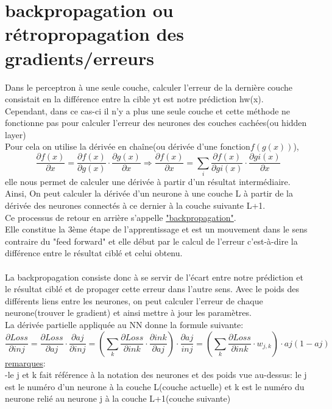 \documentclass[openany,14pt,fleqn]{book} %
\begin{document}
\section{backpropagation ou rétropropagation des gradients/erreurs}
Dans le perceptron à une seule couche, calculer l'erreur de la dernière couche consistait en la différence entre la cible yt est notre prédiction hw(x).\\
Cependant, dans ce cas-ci il n'y a plus une seule couche et cette méthode ne fonctionne pas pour calculer l'erreur des neurones des couches cachées(ou hidden layer)\\
Pour cela on utilise la dérivée en chaîne(ou dérivée d'une fonction$f(g(x)) $),$$\frac{\partial f(x)}{\partial x} = \frac{\partial f(x)}{\partial g(x)}\cdot \frac{\partial g(x)}{\partial x}
\Rightarrow \frac{\partial f(x)}{\partial x} = \sum_{i} \frac{\partial f(x)}{\partial gi(x)}\cdot \frac{\partial gi(x)}{\partial x} $$ elle nous permet de calculer une dérivée à partir d'un résultat intermédiaire. Ainsi, On peut calculer la dérivée d'un neurone à une couche L à partir de la dérivée des neurones connectés à ce dernier à la couche suivante L+1.\cite{Hugo_Larochelle12}\\
Ce processus de retour en arrière s'appelle \underline{"backpropagation"}.\\
Elle constitue la 3ème étape de l'apprentissage et est un mouvement dans le sens contraire du "feed forward" et elle début par le calcul de l'erreur c'est-à-dire la différence entre le résultat ciblé et celui obtenu.\\
\\La backpropagation consiste donc à se servir de l'écart entre notre prédiction et le résultat ciblé et de propager cette erreur dans l'autre sens. Avec le poids des différents liens entre les neurones, on peut calculer l'erreur de chaque neurone(trouver le gradient) et ainsi mettre à jour les paramètres.\\
La dérivée partielle appliquée au NN donne la formule suivante: 
\[\frac{\partial Loss}{\partial inj} = \frac{\partial Loss}{\partial aj}\cdot \frac{\partial aj}{\partial inj} = (\sum_{k} \frac{\partial Loss}{\partial ink}\cdot \frac{\partial ink}{\partial aj})\cdot \frac{\partial aj}{inj} = (\sum_{k} \frac{\partial Loss}{\partial ink} \cdot w_{j,k})\cdot aj(1-aj) \]
\underline{remarques}:\\
-le j et k fait référence à la notation des neurones et des poids vue au-dessus: le j est le numéro d'un neurone à la couche L(couche actuelle) et k est le numéro du neurone relié au neurone j à la couche L+1(couche suivante)\\
\end{document}

